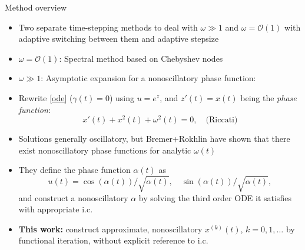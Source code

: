 \documentclass{beamer}
\numberwithin{equation}{theorem}
\begin{document}
\begin{noframe}
    Method overview \medskip
    {\footnotesize
    \begin{itemize} 
    \item{Two separate time-stepping methods to deal with $\omega \gg 1$ and $\omega = \mathcal{O}(1)$ with adaptive switching between them and adaptive stepsize}
    \item{$\omega = \mathcal{O}(1)$: Spectral method based on Chebyshev nodes }
    \item{$\omega \gg 1$: Asymptotic expansion for a nonoscillatory phase function:}
    \item{Rewrite \cref{ode} ($\gamma(t) = 0$) using $u = e^z$, and $z'(t) = x(t)$ being the \emph{phase function}:
    \begin{equation}
        x'(t) + x^2(t) + \omega^2(t) = 0, \quad \text{(Riccati)}
    \end{equation}
    }
    \item{Solutions generally oscillatory, but Bremer+Rokhlin have shown that there exist nonoscillatory phase functions for analytic $\omega(t)$}
    \item{They define the phase function $\alpha(t)$ as  $$u(t) = \cos(\alpha(t))/\sqrt{\alpha(t)},\quad \sin(\alpha(t))/\sqrt{\alpha(t)},$$ and construct a nonoscillatory $\alpha$ by solving the third order ODE it satisfies with appropriate i.c.}
    \item{\textbf{This work:} construct approximate, nonoscillatory $x^{(k)}(t)$, $k=0, 1, \ldots$ by functional iteration, without explicit reference to i.c.  }
    \end{itemize}
    }
\end{noframe}
\end{document}
